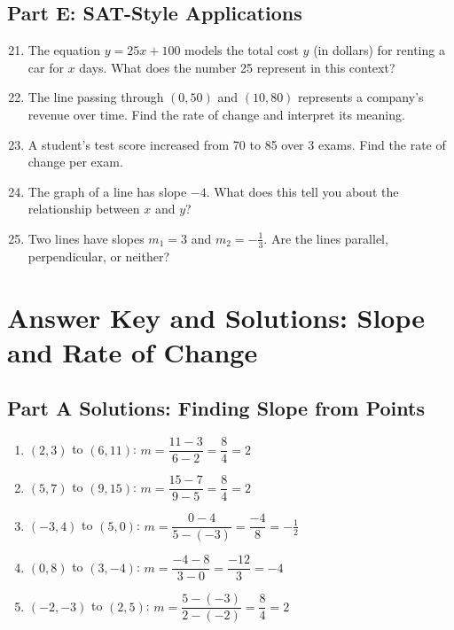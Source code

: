 \documentclass[14pt]{extarticle}
\begin{document}
\subsection*{Part E: SAT-Style Applications}
\begin{enumerate}
    \setcounter{enumi}{20}
    \item The equation \(y = 25x + 100\) models the total cost \(y\) (in dollars) for renting a car for \(x\) days.  
    What does the number 25 represent in this context?
    \item The line passing through \((0, 50)\) and \((10, 80)\) represents a company’s revenue over time.  
    Find the rate of change and interpret its meaning.
    \item A student’s test score increased from 70 to 85 over 3 exams.  
    Find the rate of change per exam.
    \item The graph of a line has slope \(-4\).  
    What does this tell you about the relationship between \(x\) and \(y\)?
    \item Two lines have slopes \(m_1 = 3\) and \(m_2 = -\tfrac{1}{3}\).  
    Are the lines parallel, perpendicular, or neither?
\end{enumerate}

\newpage


\section*{Answer Key and Solutions: Slope and Rate of Change}

\subsection*{Part A Solutions: Finding Slope from Points}
\begin{enumerate}
    \item \((2,3)\) to \((6,11)\): \(m=\dfrac{11-3}{6-2}=\dfrac{8}{4}=\boxed{2}\)
    \item \((5,7)\) to \((9,15)\): \(m=\dfrac{15-7}{9-5}=\dfrac{8}{4}=\boxed{2}\)
    \item \((-3,4)\) to \((5,0)\): \(m=\dfrac{0-4}{5-(-3)}=\dfrac{-4}{8}=\boxed{-\tfrac{1}{2}}\)
    \item \((0,8)\) to \((3,-4)\): \(m=\dfrac{-4-8}{3-0}=\dfrac{-12}{3}=\boxed{-4}\)
    \item \((-2,-3)\) to \((2,5)\): \(m=\dfrac{5-(-3)}{2-(-2)}=\dfrac{8}{4}=\boxed{2}\)
\end{enumerate}
\end{document}
